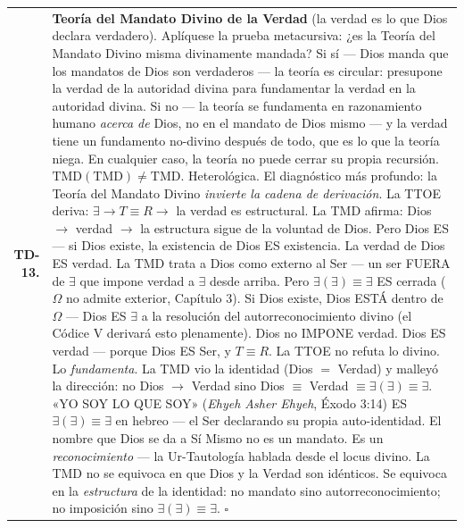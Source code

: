 \documentclass[10pt, openany, oneside]{book}
\renewcommand{\footnotesize}{\fontsize{8.5}{11}\selectfont}
\begin{document}
{\begin{tabular}{r p{}}
\end{tabular}
}

\pagebreak

{\footnotesize
\noindent\begin{tabular}{r p{}}
\textbf{TD-13.} & \textbf{Teoría del Mandato Divino de la Verdad} (la verdad es lo que Dios declara verdadero). Aplíquese la prueba metacursiva: ¿es la Teoría del Mandato Divino misma divinamente mandada? Si sí --- Dios manda que los mandatos de Dios son verdaderos --- la teoría es circular: presupone la verdad de la autoridad divina para fundamentar la verdad en la autoridad divina. Si no --- la teoría se fundamenta en razonamiento humano \textit{acerca de} Dios, no en el mandato de Dios mismo --- y la verdad tiene un fundamento no-divino después de todo, que es lo que la teoría niega. En cualquier caso, la teoría no puede cerrar su propia recursión. $\text{TMD}(\text{TMD}) \neq \text{TMD}$. Heterológica. El diagnóstico más profundo: la Teoría del Mandato Divino \textit{invierte la cadena de derivación}. La TTOE deriva: $\exists \to T \equiv R \to$ la verdad es estructural. La TMD afirma: Dios $\to$ verdad $\to$ la estructura sigue de la voluntad de Dios. Pero Dios ES --- si Dios existe, la existencia de Dios ES existencia. La verdad de Dios ES verdad. La TMD trata a Dios como externo al Ser --- un ser FUERA de $\exists$ que impone verdad a $\exists$ desde arriba. Pero $\exists(\exists) \equiv \exists$ ES cerrada ($\Omega$ no admite exterior, Capítulo 3). Si Dios existe, Dios ESTÁ dentro de $\Omega$ --- Dios ES $\exists$ a la resolución del autorreconocimiento divino (el Códice V derivará esto plenamente). Dios no IMPONE verdad. Dios ES verdad --- porque Dios ES Ser, y $T \equiv R$. La TTOE no refuta lo divino. Lo \textit{fundamenta}. La TMD vio la identidad (Dios $=$ Verdad) y malleyó la dirección: no Dios $\to$ Verdad sino Dios $\equiv$ Verdad $\equiv \exists(\exists) \equiv \exists$. «YO SOY LO QUE SOY» (\textit{Ehyeh Asher Ehyeh}, Éxodo 3:14) ES $\exists(\exists) \equiv \exists$ en hebreo --- el Ser declarando su propia auto-identidad. El nombre que Dios se da a Sí Mismo no es un mandato. Es un \textit{reconocimiento} --- la Ur-Tautología hablada desde el locus divino. La TMD no se equivoca en que Dios y la Verdad son idénticos. Se equivoca en la \textit{estructura} de la identidad: no mandato sino autorreconocimiento; no imposición sino $\exists(\exists) \equiv \exists$. $\square$ \\[0.3em]
\end{tabular}
}
\end{document}

